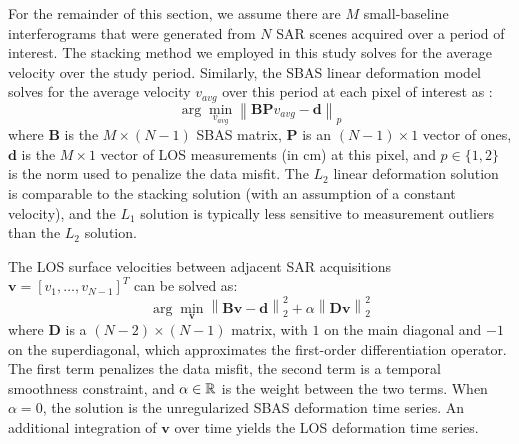 \documentclass[draft,grl]{agutexSI2019}
\newcommand{\norm}[1]{\left\lVert#1\right\rVert}
\begin{document}
\begin{article}
For the remainder of this section, we assume there are $M$ small-baseline interferograms that were generated from $N$ SAR scenes acquired over a period of interest. The stacking method we employed in this study \cite{Sandwell1998} solves for the average velocity over the study period. Similarly, the SBAS linear deformation model solves for the average velocity $ v_{avg} $ over this period at each pixel of interest as \cite{SBAS2002}:
\begin{equation}
\arg \min_{v_{avg}} \norm{ \bm{BP} v_{avg} - \bm{d}   }_p
   \label{eq:sbas-linear}
\end{equation}
where $ \bm{B }$ is the $ M \times (N-1) $ SBAS matrix, $ \bm{P}$ is an $ (N-1) \times 1 $ vector of ones, $ \bm{d} $ is the $ M \times 1 $ vector of LOS measurements (in cm) at this pixel, and $ p \in \{1, 2\} $ is the norm used to penalize the data misfit. The $L_2$ linear deformation solution is comparable to the stacking solution (with an assumption of a constant velocity), and the $L_1$ solution is typically less sensitive to measurement outliers than the $L_2$ solution.

The LOS surface velocities between adjacent SAR acquisitions $ \bm{v} = \left[v_1 , \ldots , v_{N-1} \right]^T $ can be solved as:
\begin{equation}
\arg \min_{\bm{v} } \norm{ \bm{Bv} - \bm{d}   }^2_2 + \alpha \norm{ \bm{Dv} }^2_2  \label{eq:sbas}
\end{equation}
where $ \bm{D} $ is a $ (N-2) \times (N-1) $ matrix, with $1$ on the main diagonal and $-1$ on the superdiagonal, which approximates the first-order differentiation operator. The first term penalizes the data misfit, the second term is a temporal smoothness constraint, and $ \alpha \in \Bbb{R} $ is the weight between the two terms. When $ \alpha = 0 $, the solution is the unregularized SBAS deformation time series. An additional integration of $\mathbf{v}$ over time yields the LOS deformation time series.


\end{article}
\end{document}
